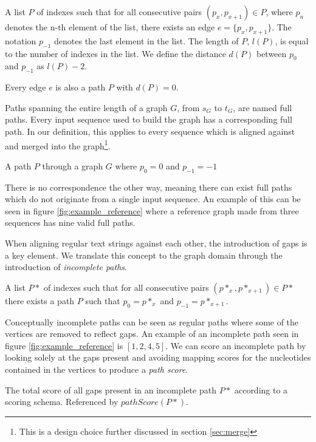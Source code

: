 \documentclass[thesis.tex]{subfiles}
\begin{document}
{\begin{defn}
  A list $P$ of indexes such that for all consecutive pairs $(p_x, p_{x+1}) \in P$, where $p_n$ denotes the n-th element of the list, there exists an edge $e=\{p_x, p_{x+1}\}$. The notation $p_{-1}$ denotes the last element in the list. The length of $P$, $l(P)$, is equal to the number of indexes in the list. We define the distance $d(P)$ between $p_0$ and $p_{-1}$ as $l(P) - 2$.
\end{defn}
\begin{corollary}
  Every edge $e$ is also a path $P$ with $d(P)=0$.
\end{corollary}
Paths spanning the entire length of a graph $G$, from $s_G$ to $t_G$, are named full paths. Every input sequence used to build the graph has a corresponding full path. In our definition, this applies to every sequence which is aligned against and merged into the graph\footnote{This is a design choice further discussed in section \ref{sec:merge}}.
\begin{defn}
  A path $P$ through a graph $G$ where $p_0=0$ and $p_{-1}=-1$
\end{defn}
There is no correspondence the other way, meaning there can exist full paths which do not originate from a single input sequence. An example of this can be seen in figure \ref{fig:example_reference} where a reference graph made from three sequences has nine valid full paths.\\
\par\noindent
When aligning regular text strings against each other, the introduction of gaps is a key element. We translate this concept to the graph domain through the introduction of \textit{incomplete paths}.
\begin{defn}
  A list $P*$ of indexes such that for all consecutive pairs $(p*_x, p*_{x+1}) \in P*$ there exists a path $P$ such that $p_0=p*_x$ and $p_{-1}=p*_{x+1}$.
\end{defn}
Conceptually incomplete paths can be seen as regular paths where some of the vertices are removed to reflect gaps. An example of an incomplete path seen in figure \ref{fig:example_reference} is $[1, 2, 4, 5]$. We can score an incomplete path by looking solely at the gaps present and avoiding mapping scores for the nucleotides contained in the vertices to produce a \textit{path score}. 
\begin{defn}
  The total score of all gaps present in an incomplete path $P*$ according to a scoring schema. Referenced by $pathScore(P*)$.

\end{defn}}
\end{document}
